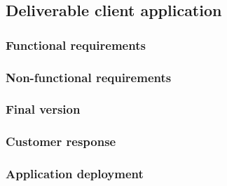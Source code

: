 \subsection{Deliverable client application}
	\subsubsection{Functional requirements}
	\subsubsection{Non-functional requirements}
	\subsubsection{Final version}
	\subsubsection{Customer response}
	\subsubsection{Application deployment}
	


